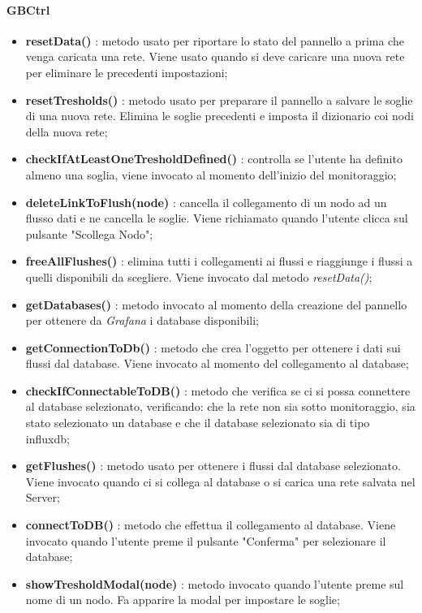 	  \paragraph{GBCtrl} 
		\begin{itemize}
			\item \textbf{resetData()} : metodo usato per riportare lo stato del pannello a prima che venga caricata una rete. Viene usato quando si deve caricare una nuova rete per eliminare le precedenti impostazioni;
			\item \textbf{resetTresholds()} : metodo usato per preparare il pannello a salvare le soglie di una nuova rete. Elimina le soglie precedenti e imposta il dizionario coi nodi della nuova rete;
			\item \textbf{checkIfAtLeastOneTresholdDefined()} : controlla se l'utente ha definito almeno una soglia, viene invocato al momento dell'inizio del monitoraggio;
			\item \textbf{deleteLinkToFlush(node)} : cancella il collegamento di un nodo ad un flusso dati e ne cancella le soglie. Viene richiamato quando l'utente clicca sul pulsante "Scollega Nodo";
			\item \textbf{freeAllFlushes()} : elimina tutti i collegamenti ai flussi e riaggiunge i flussi a quelli disponibili da scegliere. Viene invocato dal metodo \textit{resetData()};
			\item \textbf{getDatabases()} : metodo invocato al momento della creazione del pannello per ottenere da \textit{Grafana} i database disponibili;
			\item \textbf{getConnectionToDb()} : metodo che crea l'oggetto per ottenere i dati sui flussi dal database. Viene invocato al momento del collegamento al database;
			\item \textbf{checkIfConnectableToDB()} : metodo che verifica se ci si possa connettere al database selezionato, verificando: che la rete non sia sotto monitoraggio, sia stato selezionato un database e che il database selezionato sia di tipo influxdb;
			\item \textbf{getFlushes()} : metodo usato per ottenere i flussi dal database selezionato. Viene invocato quando ci si collega al database  o si carica una rete salvata nel Server;
			\item \textbf{connectToDB()} : metodo che effettua il collegamento al database. Viene invocato quando l'utente preme il pulsante "Conferma" per selezionare il database;
			\item \textbf{showTresholdModal(node)} : metodo invocato quando l'utente preme sul nome di un nodo. Fa apparire la modal per impostare le soglie;

\end{itemize}
